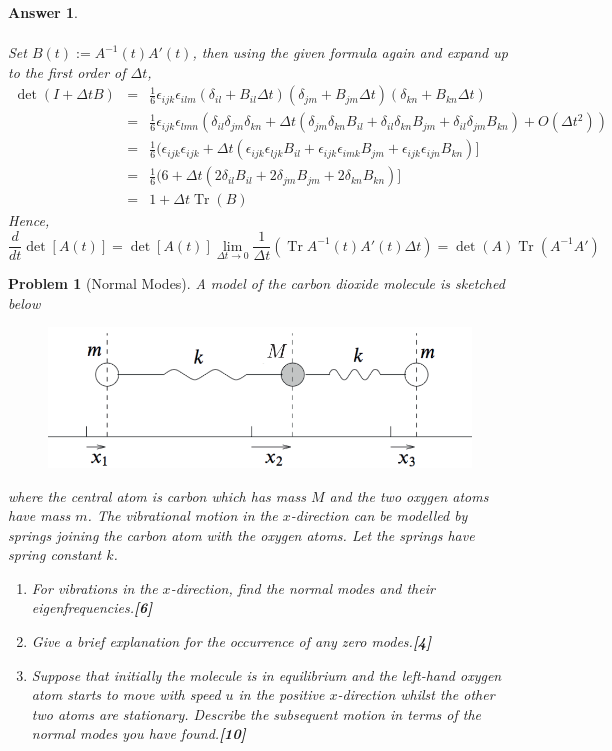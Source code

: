 \documentclass[a4paper]{article}
\DeclareMathOperator{\Tr}{Tr}
\newtheorem{ans}{Answer}[section]
\theoremstyle{new}
\newtheorem{qns}{Problem}[section]
\begin{document}
\begin{ans}
\begin{enumerate}[label=(\roman*)]
\begin{eqnarray}
\end{eqnarray}
Set $B(t):=A^{-1}(t)A'(t)$, then using the given formula again and expand up to the first order of $\Delta t$,
\begin{eqnarray}
\det(I+\Delta tB)&=&\frac{1}{6}\epsilon_{ijk}\epsilon_{ilm}(\delta_{il}+B_{il}\Delta t)(\delta_{jm}+B_{jm}\Delta t)(\delta_{kn}+B_{kn}\Delta t)\nonumber\\&=&\frac{1}{6}\epsilon_{ijk}\epsilon_{lmn}(\delta_{il}\delta_{jm}\delta_{kn}+\Delta t(\delta_{jm}\delta_{kn}B_{il}+\delta_{il}\delta_{kn}B_{jm}+\delta_{il}\delta_{jm}B_{kn})+O(\Delta t^2))\nonumber\\&=&\frac{1}{6}(\epsilon_{ijk}\epsilon_{ijk}+\Delta t(\epsilon_{ijk}\epsilon_{ljk}B_{il}+\epsilon_{ijk}\epsilon_{imk}B_{jm}+\epsilon_{ijk}\epsilon_{ijn}B_{kn})]\nonumber\\&=&\frac{1}{6}(6+\Delta t(2\delta_{il} B_{il}+2\delta_{jm}B_{jm}+2\delta_{kn}B_{kn})]\nonumber\\&=&1+\Delta t\Tr(B)\nonumber
\end{eqnarray}
Hence,
$$\frac{d}{dt}\det[A(t)]=\det[A(t)]\lim_{\Delta t\rightarrow 0}\frac{1}{\Delta t}(\Tr A^{-1}(t)A'(t)\Delta t)=\det(A)\Tr(A^{-1}A')$$
\end{enumerate}
\end{ans}
\begin{qns}[Normal Modes]
A model of the carbon dioxide molecule is sketched below
\begin{figure}[H]
    \centering
    \includegraphics[scale=0.7]{2012P2Q7.PNG}
\end{figure}
where the central atom is carbon which has mass $M$ and the two oxygen atoms have mass $m$. The vibrational motion in the $x$-direction can be modelled by springs joining the carbon atom with the oxygen atoms. Let the springs have spring constant $k$. 
\begin{enumerate}[label=(\roman*)]
\item For vibrations in the $x$-direction, find the normal modes and their eigenfrequencies.\hfill\textbf{[6]}
\item Give a brief explanation for the occurrence of any zero modes.\hfill\textbf{[4]}
\item Suppose that initially the molecule is in equilibrium and the left-hand oxygen atom starts to move with speed $u$ in the positive $x$-direction whilst the other two atoms are stationary. Describe the subsequent motion in terms of the normal modes you have found.\hfill\textbf{[10]}
\end{enumerate}
\end{qns}
\end{document}
